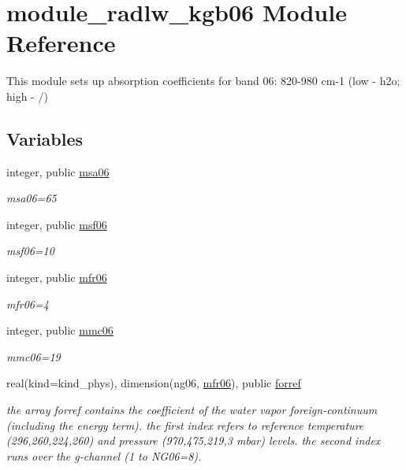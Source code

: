\hypertarget{namespacemodule__radlw__kgb06}{}\section{module\+\_\+radlw\+\_\+kgb06 Module Reference}
\label{namespacemodule__radlw__kgb06}


This module sets up absorption coefficients for band 06\+: 820-\/980 cm-\/1 (low -\/ h2o; high -\/ /)  


\subsection*{Variables}
\begin{DoxyCompactItemize}
\item 
\mbox{\label{namespacemodule__radlw__kgb06_add7b5d0d3ea44e1e677948c33e870333}} 
integer, public \hyperlink{namespacemodule__radlw__kgb06_add7b5d0d3ea44e1e677948c33e870333}{msa06}
\begin{DoxyCompactList}\small\item\em msa06=65 \end{DoxyCompactList}\item 
integer, public \hyperlink{group__module__radlw__kgbnn_ga65f808aeb87457d383dd7f9366878fb9}{msf06}
\begin{DoxyCompactList}\small\item\em msf06=10 \end{DoxyCompactList}\item 
integer, public \hyperlink{group__module__radlw__kgbnn_gaaf1f13cdb5c2888b416a91e8b17e41d8}{mfr06}
\begin{DoxyCompactList}\small\item\em mfr06=4 \end{DoxyCompactList}\item 
integer, public \hyperlink{group__module__radlw__kgbnn_gaf7a377cb66fd48348789c20f5a31dec6}{mmc06}
\begin{DoxyCompactList}\small\item\em mmc06=19 \end{DoxyCompactList}\item 
real(kind=kind\+\_\+phys), dimension(ng06, \hyperlink{group__module__radlw__kgbnn_gaaf1f13cdb5c2888b416a91e8b17e41d8}{mfr06}), public \hyperlink{group__module__radlw__kgbnn_ga6a0467b666bc75f90ae58fa4f58f07f0}{forref}
\begin{DoxyCompactList}\small\item\em the array forref contains the coefficient of the water vapor foreign-\/continuum (including the energy term). the first index refers to reference temperature (296,260,224,260) and pressure (970,475,219,3 mbar) levels. the second index runs over the g-\/channel (1 to N\+G06=8). \end{DoxyCompactList}\item 

\end{DoxyCompactItemize}
